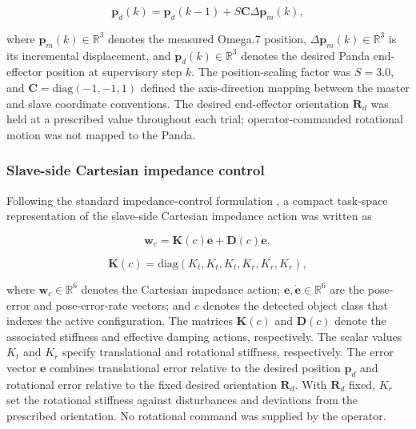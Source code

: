 \begin{equation}
\label{eq:desired-slave-position}
\mathbf{p}_d(k)=\mathbf{p}_d(k-1)+S\mathbf{C}\Delta\mathbf{p}_m(k),
\end{equation}

where $\mathbf{p}_m(k)\in\mathbb{R}^3$ denotes the measured Omega.7 position, $\Delta\mathbf{p}_m(k)\in\mathbb{R}^3$ is its incremental displacement, and $\mathbf{p}_d(k)\in\mathbb{R}^3$ denotes the desired Panda end-effector position at supervisory step $k$. The position-scaling factor was $S=3.0$, and $\mathbf{C}=\mathrm{diag}(-1,-1,1)$ defined the axis-direction mapping between the master and slave coordinate conventions. The desired end-effector orientation $\mathbf{R}_d$ was held at a prescribed value throughout each trial; operator-commanded rotational motion was not mapped to the Panda.

\subsubsection{Slave-side Cartesian impedance control}
Following the standard impedance-control formulation \cite{ref03}, a compact task-space representation of the slave-side Cartesian impedance action was written as

\begin{equation}
\label{eq:cartesian-impedance}
\mathbf{w}_c=\mathbf{K}(c)\mathbf{e}+\mathbf{D}(c)\dot{\mathbf{e}},
\end{equation}

\begin{equation}
\label{eq:stiffness-matrix}
\mathbf{K}(c)=\mathrm{diag}(K_t,K_t,K_t,K_r,K_r,K_r),
\end{equation}

where $\mathbf{w}_c\in\mathbb{R}^6$ denotes the Cartesian impedance action; $\mathbf{e},\dot{\mathbf{e}}\in\mathbb{R}^6$ are the pose-error and pose-error-rate vectors; and $c$ denotes the detected object class that indexes the active configuration. The matrices $\mathbf{K}(c)$ and $\mathbf{D}(c)$ denote the associated stiffness and effective damping actions, respectively. The scalar values $K_t$ and $K_r$ specify translational and rotational stiffness, respectively. The error vector $\mathbf{e}$ combines translational error relative to the desired position $\mathbf{p}_d$ and rotational error relative to the fixed desired orientation $\mathbf{R}_d$. With $\mathbf{R}_d$ fixed, $K_r$ set the rotational stiffness against disturbances and deviations from the prescribed orientation. No rotational command was supplied by the operator.

